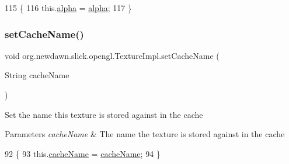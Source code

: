 \begin{DoxyCode}
115                                         \{
116         this.\mbox{\hyperlink{classorg_1_1newdawn_1_1slick_1_1opengl_1_1_texture_impl_a315687e46129b509c38a9f0ab10adee4}{alpha}} = \mbox{\hyperlink{classorg_1_1newdawn_1_1slick_1_1opengl_1_1_texture_impl_a315687e46129b509c38a9f0ab10adee4}{alpha}};
117     \}
\end{DoxyCode}
\mbox{\label{classorg_1_1newdawn_1_1slick_1_1opengl_1_1_texture_impl_ab98817505bb3ecdc635803b946ea960e}} 
\subsubsection{\texorpdfstring{set\+Cache\+Name()}{setCacheName()}}
{\footnotesize\ttfamily void org.\+newdawn.\+slick.\+opengl.\+Texture\+Impl.\+set\+Cache\+Name (\begin{DoxyParamCaption}\item[{String}]{cache\+Name }\end{DoxyParamCaption})\hspace{0.3cm}{\ttfamily [inline]}}

Set the name this texture is stored against in the cache


\begin{DoxyParams}{Parameters}
{\em cache\+Name} & The name the texture is stored against in the cache \\
\hline
\end{DoxyParams}

\begin{DoxyCode}
92                                                \{
93         this.\mbox{\hyperlink{classorg_1_1newdawn_1_1slick_1_1opengl_1_1_texture_impl_a2b5b9b6700d8cc41e1bd79adbf2bf8fc}{cacheName}} = \mbox{\hyperlink{classorg_1_1newdawn_1_1slick_1_1opengl_1_1_texture_impl_a2b5b9b6700d8cc41e1bd79adbf2bf8fc}{cacheName}};
94     \}
\end{DoxyCode}
\mbox{\label{classorg_1_1newdawn_1_1slick_1_1opengl_1_1_texture_impl_a4bc4d5951a5a0a25e2d1e30c2bedb5a3}} 
